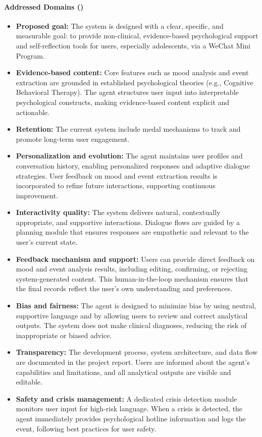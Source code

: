 \paragraph{Addressed Domains (\checkmark)}
\begin{itemize}
    \item \textbf{Proposed goal:} The system is designed with a clear, specific, and measurable goal: to provide non-clinical, evidence-based psychological support and self-reflection tools for users, especially adolescents, via a WeChat Mini Program.
    \item \textbf{Evidence-based content:} Core features such as mood analysis and event extraction are grounded in established psychological theories (e.g., Cognitive Behavioral Therapy). The agent structures user input into interpretable psychological constructs, making evidence-based content explicit and actionable.
    \item \textbf{Retention:} The current system include medal mechanisms to track and promote long-term user engagement.
    \item \textbf{Personalization and evolution:} The agent maintains user profiles and conversation history, enabling personalized responses and adaptive dialogue strategies. User feedback on mood and event extraction results is incorporated to refine future interactions, supporting continuous improvement.
    \item \textbf{Interactivity quality:} The system delivers natural, contextually appropriate, and supportive interactions. Dialogue flows are guided by a planning module that ensures responses are empathetic and relevant to the user's current state.
    \item \textbf{Feedback mechanism and support:} Users can provide direct feedback on mood and event analysis results, including editing, confirming, or rejecting system-generated content. This human-in-the-loop mechanism ensures that the final records reflect the user's own understanding and preferences.
    \item \textbf{Bias and fairness:} The agent is designed to minimize bias by using neutral, supportive language and by allowing users to review and correct analytical outputs. The system does not make clinical diagnoses, reducing the risk of inappropriate or biased advice.
    \item \textbf{Transparency:} The development process, system architecture, and data flow are documented in the project report. Users are informed about the agent's capabilities and limitations, and all analytical outputs are visible and editable.
    \item \textbf{Safety and crisis management:} A dedicated crisis detection module monitors user input for high-risk language. When a crisis is detected, the agent immediately provides psychological hotline information and logs the event, following best practices for user safety.
\end{itemize}


